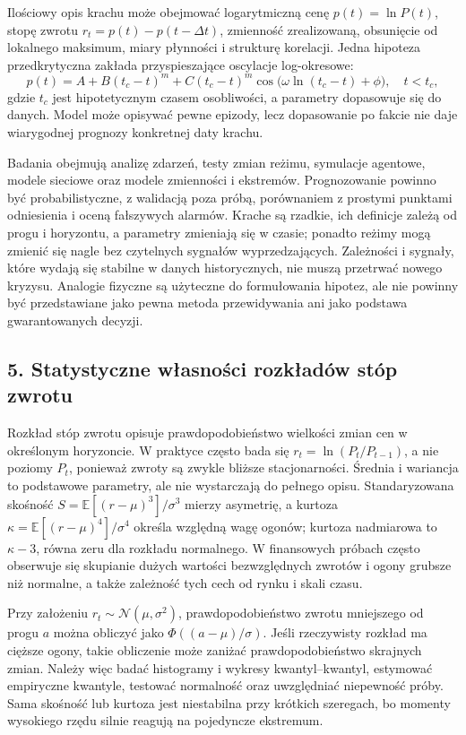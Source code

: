 \documentclass[11pt,a4paper]{article}
\begin{document}
Ilościowy opis krachu może obejmować logarytmiczną cenę \(p(t)=\ln P(t)\), stopę zwrotu \(r_t=p(t)-p(t-\Delta t)\), zmienność zrealizowaną, obsunięcie od lokalnego maksimum, miary płynności i strukturę korelacji. Jedna hipoteza przedkrytyczna zakłada przyspieszające oscylacje log-okresowe:
\[
p(t)=A+B(t_c-t)^m+C(t_c-t)^m
\cos\!\bigl(\omega\ln(t_c-t)+\phi\bigr),\quad t<t_c,
\]
gdzie \(t_c\) jest hipotetycznym czasem osobliwości, a parametry dopasowuje się do danych. Model może opisywać pewne epizody, lecz dopasowanie po fakcie nie daje wiarygodnej prognozy konkretnej daty krachu.

Badania obejmują analizę zdarzeń, testy zmian reżimu, symulacje agentowe, modele sieciowe oraz modele zmienności i ekstremów. Prognozowanie powinno być probabilistyczne, z walidacją poza próbą, porównaniem z prostymi punktami odniesienia i oceną fałszywych alarmów. Krache są rzadkie, ich definicje zależą od progu i horyzontu, a parametry zmieniają się w czasie; ponadto reżimy mogą zmienić się nagle bez czytelnych sygnałów wyprzedzających. Zależności i sygnały, które wydają się stabilne w danych historycznych, nie muszą przetrwać nowego kryzysu. Analogie fizyczne są użyteczne do formułowania hipotez, ale nie powinny być przedstawiane jako pewna metoda przewidywania ani jako podstawa gwarantowanych decyzji.

\subsection{5. Statystyczne własności rozkładów stóp zwrotu}

Rozkład stóp zwrotu opisuje prawdopodobieństwo wielkości zmian cen w określonym horyzoncie. W praktyce często bada się \(r_t=\ln(P_t/P_{t-1})\), a nie poziomy \(P_t\), ponieważ zwroty są zwykle bliższe stacjonarności. Średnia i wariancja to podstawowe parametry, ale nie wystarczają do pełnego opisu. Standaryzowana skośność \(S=\mathbb E[(r-\mu)^3]/\sigma^3\) mierzy asymetrię, a kurtoza \(\kappa=\mathbb E[(r-\mu)^4]/\sigma^4\) określa względną wagę ogonów; kurtoza nadmiarowa to \(\kappa-3\), równa zeru dla rozkładu normalnego. W finansowych próbach często obserwuje się skupianie dużych wartości bezwzględnych zwrotów i ogony grubsze niż normalne, a także zależność tych cech od rynku i skali czasu.

Przy założeniu \(r_t\sim\mathcal N(\mu,\sigma^2)\), prawdopodobieństwo zwrotu mniejszego od progu \(a\) można obliczyć jako \(\Phi((a-\mu)/\sigma)\). Jeśli rzeczywisty rozkład ma cięższe ogony, takie obliczenie może zaniżać prawdopodobieństwo skrajnych zmian. Należy więc badać histogramy i wykresy kwantyl–kwantyl, estymować empiryczne kwantyle, testować normalność oraz uwzględniać niepewność próby. Sama skośność lub kurtoza jest niestabilna przy krótkich szeregach, bo momenty wysokiego rzędu silnie reagują na pojedyncze ekstremum.
\end{document}
